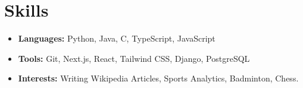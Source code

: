 \documentclass[letterpaper,12pt]{article}
\newcommand{\resumeItem}[2]{
  \item\small{
    \textbf{#1}{ #2 \vspace{-2pt}}
  }
}
\newcommand{\resumeSubItem}[2]{\resumeItem{#1}{#2}\vspace{-2pt}}
\newcommand{\resumeSubHeadingListStart}{\begin{itemize}[leftmargin=*]}
\newcommand{\resumeSubHeadingListEnd}{\end{itemize}}
\begin{document}
\section{Skills}
  \resumeSubHeadingListStart
    \resumeSubItem{Languages:}
      {Python, Java, C, TypeScript, JavaScript}
    \resumeSubItem{Tools:}
      {Git, Next.js, React, Tailwind CSS, Django, PostgreSQL}
    \resumeSubItem{Interests:}
      {Writing Wikipedia Articles, Sports Analytics, Badminton, Chess.}
  \resumeSubHeadingListEnd

\end{document}

